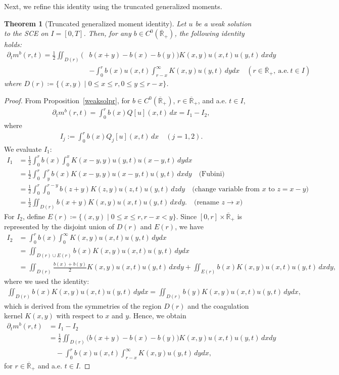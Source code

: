 \documentclass[a4paper,11pt]{article}
\newtheorem{thm}{Theorem}[section]
\def\Rb{\overline{{\mathbb R}}_+}
\begin{document}
Next, we refine this identity using the truncated generalized moments.
\begin{thm}[Truncated generalized moment identity] \label{TMI}
Let $u$ be a weak solution to the SCE on $I=[0,T]$.
Then, for any $b\in C^0(\Rb )$,
the following identity holds:
\begin{align*}
\partial_t m^b (r,t) = \frac{1}{2}\iint_{D(r)} \big(&b(x+y)-b(x)-b(y)\big)K(x,y)u(x,t)u(y,t)\,dxdy \\
&-\int^r_0 b(x)u(x,t)\int^\infty_{r-x} K(x,y)u(y,t)\,dydx\quad(r\in \Rb,~\text{a.e.}~t\in  I)
\end{align*}
where $D(r) \coloneqq \{(x,y)\mid0 \leq x \leq r, 0\leq y \leq r-x\}$.
\end{thm}
\begin{proof}
From Proposition~\ref{weaksolpr}, 
for $b\in C^0(\Rb )$, $r\in\Rb$, and a.e. $t\in I$, 
\begin{align*}
\partial_t m^b(r,t)
=\int_{0}^{r} b(x)Q[u](x,t)\,dx 
=I_1-I_2,
\end{align*}
where
\begin{align*}
I_j:=\int_{0}^{r} b(x)Q_j[u](x,t)\,dx
\quad (j=1,2).
\end{align*}
We evaluate $I_1$:
  \begin{align*}
    I_1&=\frac{1}{2}\int_{0}^{r} b(x)\int_{0}^{x}K(x-y,y)u(y,t)u(x-y,t)\,dydx\\
    &=\frac{1}{2}\int^r_0 \int^r_y b(x)K(x-y,y)u(x-y,t)u(y,t)\,dxdy\quad\mbox{(Fubini)}\\
    &=\frac{1}{2}\int^r_0 \int^{r-y}_0 b(z+y)K(z,y)u(z,t)u(y,t)\,dzdy \quad\mbox{(change variable from $x$ to $z=x-y$)}\\
    &=\frac{1}{2}\iint_{D(r)} b(x+y)K(x,y)u(x,t)u(y,t)\,dxdy.\quad\mbox{(rename $z\to x$)}
  \end{align*}
  For $I_2$, define $E(r)\coloneqq \{(x,y)\mid0 \leq x \leq r, r-x< y\}$. Since $[0,r]\times \Rb$ is represented by the disjoint union of $D(r)$ and $E(r)$, we have
\begin{align*}
I_2 &=\int_{0}^{r}b(x)\int_{0}^{\infty}K(x,y)u(x,t)u(y,t)\,dydx\\
&=\iint_{D(r)\cup E(r)}  b(x)K(x,y)u(x,t)u(y,t)\,dydx \\
    &=\iint_{D(r)} \frac{b(x)+b(y)}{2}K(x,y)u(x,t)u(y,t)\,dxdy +\iint_{E(r)} b(x)K(x,y)u(x,t)u(y,t)\,dxdy,
  \end{align*}
where we used the identity:
\begin{align*}
    \iint_{D(r)}  b(x)K(x,y)u(x,t)u(y,t)\,dydx 
   = \iint_{D(r)}  b(y)K(x,y)u(x,t)u(y,t)\,dydx,
\end{align*}
which is derived from the symmetries of the region 
$D(r)$ and the coagulation kernel $K(x,y)$ with respect to $x$ and $y$.
Hence, we obtain
\begin{align*}
    \partial_t m^b(r,t) &=I_1 - I_2\\
    &=\frac{1}{2}\iint_{D(r)} \big(b(x+y)-b(x)-b(y)\big)K(x,y)u(x,t)u(y,t)\,dxdy \\
    &\quad-\int^r_0 b(x)u(x,t)\int^\infty_{r-x} K(x,y)u(y,t)\,dydx,
\end{align*}
for $r\in\Rb$ and a.e. $t\in I$.
\end{proof}
\end{document}
